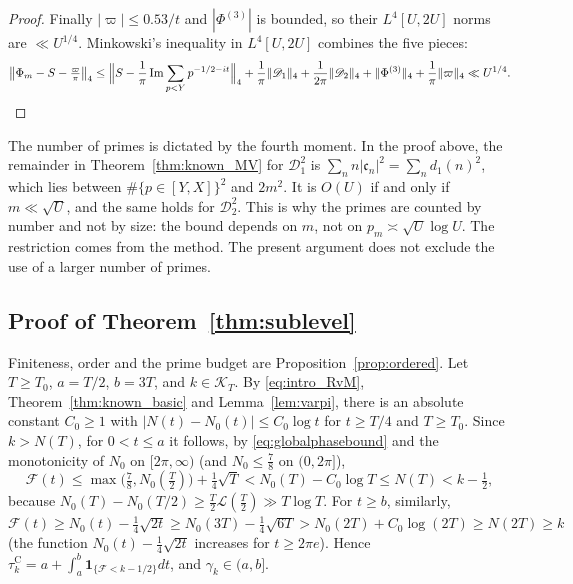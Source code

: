 \documentclass[11pt,a4paper]{article}
\makeatletter
\numberwithin{equation}{section}
\DeclareRobustCommand{\CGref}[1]{\ref{#1}}
\DeclareRobustCommand{\CGeqref}[1]{\eqref{#1}}
\let\CG@origref\ref
\let\CG@origeqref\eqref
\newcommand{\CG@gettip}[1]{\@ifundefined{CGTip@#1}{#1}{\csname CGTip@#1\endcsname}}
\DeclareRobustCommand{\CGref}[1]{\pdftooltip{\CG@origref{#1}}{\CG@gettip{#1}}}
\DeclareRobustCommand{\CGeqref}[1]{\pdftooltip{\CG@origeqref{#1}}{\CG@gettip{#1}}}
\theoremstyle{definition}
\theoremstyle{remark}
\newcommand{\Nz}{N_0} %
\newcommand{\lL}{\mathcal L}
\newcommand{\Fc}{\mathcal F}
\newcommand{\Ph}{\Phi}
\newcommand{\Ind}{\mathbf 1}
\newcommand{\Kc}{\mathcal K}
\makeatother
\begin{document}
\begin{proof}
Finally $|\varpi|\le0.53/t$ and $|\Ph^{(3)}|$ is bounded, so their $L^4[U,2U]$ norms are $\ll U^{1/4}$. Minkowski's inequality in $L^4[U,2U]$ combines the five pieces:
\[
\bigl\|\Ph_m-S-\tfrac{\varpi}\pi\bigr\|_4\le\Bigl\|S-\frac1\pi\operatorname{Im}\sum_{p<Y}p^{-1/2-it}\Bigr\|_4+\frac1\pi\|\mathscr D_1\|_4+\frac1{2\pi}\|\mathscr D_2\|_4+\|\Ph^{(3)}\|_4+\frac1\pi\|\varpi\|_4\ll U^{1/4}.\qedhere
\]
\end{proof}

The number of primes is dictated by the fourth moment. In the proof above, the remainder in Theorem~\CGref{thm:known_MV} for $\mathscr D_1^2$ is $\sum_nn|\mathfrak c_n|^2=\sum_nd_1(n)^2$, which lies between $\#\{p\in[Y,X]\}^2$ and $2m^2$. It is $O(U)$ if and only if $m\ll\sqrt U$, and the same holds for $\mathscr D_2^2$. This is why the primes are counted by number and not by size: the bound depends on $m$, not on $p_m\asymp\sqrt U\log U$. The restriction comes from the method. The present argument does not exclude the use of a larger number of primes.

\subsection{Proof of Theorem~\ref{thm:sublevel}}\label{subsec:proof_sublevel}
Finiteness, order and the prime budget are Proposition~\CGref{prop:ordered}. Let $T\ge T_0$, $a=T/2$, $b=3T$, and $k\in\Kc_T$. By \CGeqref{eq:intro_RvM}, Theorem~\CGref{thm:known_basic} and Lemma~\CGref{lem:varpi}, there is an absolute constant $C_0\ge1$ with $|N(t)-\Nz(t)|\le C_0\log t$ for $t\ge T/4$ and $T\ge T_0$. Since $k>N(T)$, for $0<t\le a$ it follows, by \CGeqref{eq:globalphasebound} and the monotonicity of $\Nz$ on $[2\pi,\infty)$ (and $\Nz\le\frac78$ on $(0,2\pi]$),
\[
\Fc(t)\le\max\bigl(\tfrac78,\Nz(\tfrac T2)\bigr)+\tfrac14\sqrt T<\Nz(T)-C_0\log T\le N(T)<k-\tfrac12,
\]
because $\Nz(T)-\Nz(T/2)\ge\frac T2\lL(\frac T2)\gg T\log T$. For $t\ge b$, similarly, $\Fc(t)\ge\Nz(t)-\frac14\sqrt{2t}\ge\Nz(3T)-\frac14\sqrt{6T}>\Nz(2T)+C_0\log(2T)\ge N(2T)\ge k$ (the function $\Nz(t)-\frac14\sqrt{2t}$ increases for $t\ge2\pi e$). Hence $\tau_{k}^{\mathrm C}=a+\int_a^b\Ind_{\{\Fc<k-1/2\}}dt$, and $\gamma_k\in(a,b]$.
\end{document}

